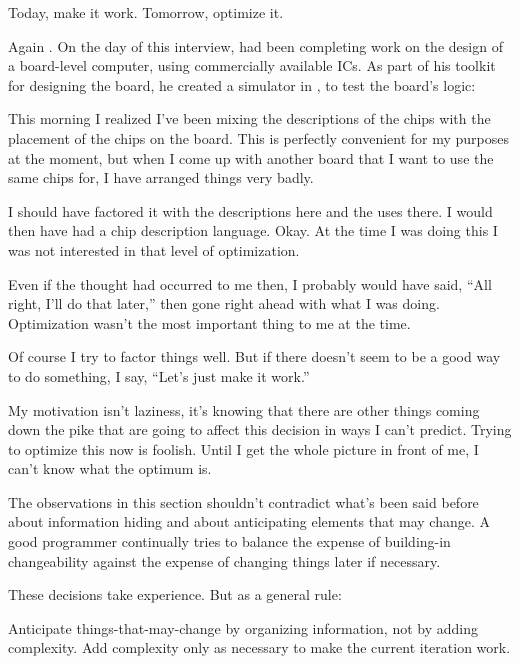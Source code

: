 \begin{tip}
Today, make it work. Tomorrow, optimize it.
\end{tip}
\begin{interview}
Again . On the day of this
interview,  had been completing work on the design of a
board-level \Forth{} computer, using commercially available ICs. As
part of his toolkit for designing the board, he created a simulator in
\Forth{}, to test the board's logic:

\begin{tfquot}
This morning I realized I've been mixing the descriptions of the chips
with the placement of the chips on the board. This is perfectly
convenient for my purposes at the moment, but when I come up with
another board that I want to use the same chips for, I have arranged
things very badly.

I should have factored it with the descriptions here and the uses
there. I would then have had a chip description language. Okay. At the
time I was doing this I was not interested in that level of
optimization.

Even if the thought had occurred to me then, I probably would have
said, ``All right, I'll do that later,'' then gone right ahead with
what I was doing. Optimization wasn't the most important thing to me
at the time.

Of course I try to factor things well. But if there doesn't seem to be
a good way to do something, I say, ``Let's just make it work.''

My motivation isn't laziness, it's knowing that there are other things
coming down the pike that are going to affect this decision in ways I
can't predict. Trying to optimize this now is foolish. Until I get the
whole picture in front of me, I can't know what the optimum is.
\end{tfquot}
\end{interview}
The observations in this section shouldn't contradict what's been said
before about information hiding and about anticipating elements that
may change. A good programmer continually tries to balance the expense
of building-in changeability against the expense of changing things
later if necessary.

These decisions take experience. But as a general rule:

\begin{tip}
Anticipate things-that-may-change by organizing information, not by
adding complexity. Add complexity only as necessary to make the
current iteration work.
\end{tip}

